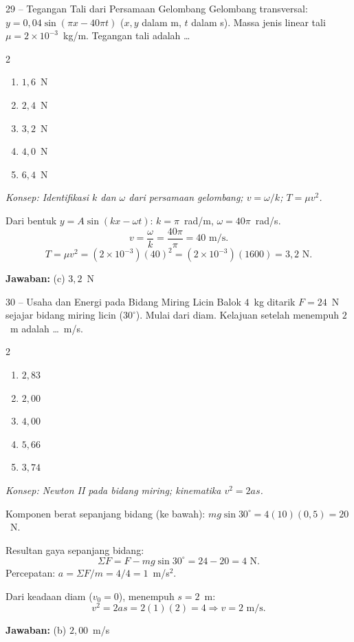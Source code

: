 \documentclass[11pt]{article}
\newcommand{\jawaban}[1]{%
  \noindent\colorbox{gold!30}{\parbox{\dimexpr\linewidth-2\fboxsep\relax}{%
    \textbf{Jawaban:} #1}}\par\smallskip}
\newcommand{\konsep}[1]{\textit{Konsep: #1.}\par\smallskip}
\newenvironment{pilB}{%
  \par\smallskip\begin{multicols}{2}
  \begin{enumerate}[label=(\alph*),leftmargin=*,itemsep=1pt,topsep=3pt]}%
  {\end{enumerate}\end{multicols}}
\begin{document}
\begin{soal}{29 -- Tegangan Tali dari Persamaan Gelombang}
Gelombang transversal: $y=0{,}04\sin(\pi x-40\pi t)$ ($x,y$ dalam m, $t$ dalam s).
Massa jenis linear tali $\mu=2\times10^{-3}$~kg/m. Tegangan tali adalah \ldots
\begin{pilB}
  \item $1{,}6$~N \item $2{,}4$~N \item $3{,}2$~N \item $4{,}0$~N \item $6{,}4$~N
\end{pilB}
\end{soal}
\begin{pembox}
\konsep{Identifikasi $k$ dan $\omega$ dari persamaan gelombang; $v=\omega/k$; $T=\mu v^2$}
Dari bentuk $y=A\sin(kx-\omega t)$: $k=\pi$~rad/m, $\omega=40\pi$~rad/s.
\[
v = \frac{\omega}{k} = \frac{40\pi}{\pi} = 40\text{ m/s}.
\]
\[
T = \mu v^2 = (2\times10^{-3})(40)^2 = (2\times10^{-3})(1600) = 3{,}2\text{ N}.
\]
\jawaban{(c) $3{,}2$~N}
\end{pembox}

\begin{soal}{30 -- Usaha dan Energi pada Bidang Miring Licin}
Balok $4$~kg ditarik $F=24$~N sejajar bidang miring licin ($30^\circ$). Mulai dari diam.
Kelajuan setelah menempuh $2$~m adalah \ldots~m/s.
\begin{pilB}
  \item $2{,}83$ \item $2{,}00$ \item $4{,}00$ \item $5{,}66$ \item $3{,}74$
\end{pilB}
\end{soal}
\begin{pembox}
\konsep{Newton II pada bidang miring; kinematika $v^2=2as$}
Komponen berat sepanjang bidang (ke bawah): $mg\sin30^\circ = 4(10)(0{,}5) = 20$~N.

Resultan gaya sepanjang bidang:
\[
\Sigma F = F - mg\sin30^\circ = 24 - 20 = 4\text{ N}.
\]
Percepatan: $a = \Sigma F/m = 4/4 = 1$~m/s$^2$.

Dari keadaan diam ($v_0=0$), menempuh $s=2$~m:
\[
v^2 = 2as = 2(1)(2) = 4 \Rightarrow v = 2\text{ m/s}.
\]
\jawaban{(b) $2{,}00$~m/s}
\end{pembox}
\end{document}
